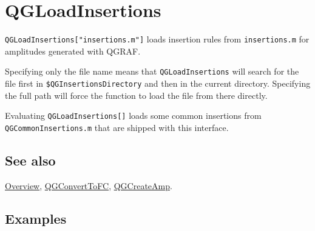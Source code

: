 \documentclass[../FeynHelpersManual.tex]{subfiles}
\begin{document}
\hypertarget{qgloadinsertions}{
\section{QGLoadInsertions}\label{qgloadinsertions}}

\texttt{QGLoadInsertions[\allowbreak{}"insertions.m"]} loads insertion
rules from \texttt{insertions.m} for amplitudes generated with QGRAF.

Specifying only the file name means that \texttt{QGLoadInsertions} will
search for the file first in \texttt{\$QGInsertionsDirectory} and then
in the current directory. Specifying the full path will force the
function to load the file from there directly.

Evaluating \texttt{QGLoadInsertions[\allowbreak{}]} loads some common
insertions from \texttt{QGCommonInsertions.m} that are shipped with this
interface.

\subsection{See also}

\hyperlink{toc}{Overview}, \hyperlink{qgconverttofc}{QGConvertToFC},
\hyperlink{qgcreateamp}{QGCreateAmp}.

\subsection{Examples}
\end{document}
